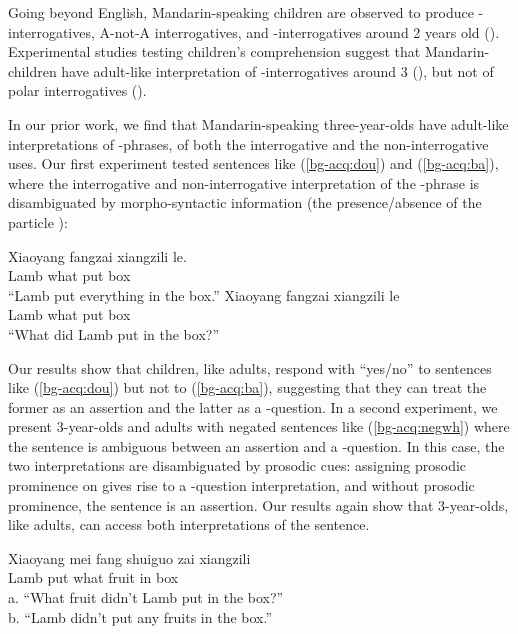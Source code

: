 Going beyond English, Mandarin-speaking children are observed to produce \ma-interrogatives, A-not-A interrogatives, and \twh-interrogatives around 2 years old (\citealt{miao1986acq, miao1992, lee1989acq, litang1991int, lichen1997compprod, lichen1997comp, fan2012, lijingwong2017}). Experimental studies testing children’s comprehension suggest that Mandarin-children have adult-like interpretation of \twh-interrogatives around 3 (\citealt{fahn2003acq}), but not of polar interrogatives (\citealt{moradlou2020}). 

In our prior work, we find that Mandarin-speaking three-year-olds have adult-like interpretations of \twh-phrases, of both the interrogative and the non-interrogative uses. Our first experiment tested sentences like (\ref{bg-acq:dou}) and (\ref{bg-acq:ba}), where the interrogative and non-interrogative interpretation of the \twh-phrase is disambiguated by morpho-syntactic information (the presence/absence of the particle \dou{}):

	
\gll Xiaoyang 	 	 	fangzai 	xiangzili 	le.\\
Lamb	what	\Dou{}	put 	box		\Asp{}\\
``Lamb put everything in the box.''
\eex
{}
\gll Xiaoyang	  	fangzai 	xiangzili 	le\\
	Lamb		what	put	box		\Asp{}\\
	``What did Lamb put in the box?''
\eex


Our results show that children, like adults, respond with “yes/no” to sentences like (\ref{bg-acq:dou}) but not to (\ref{bg-acq:ba}), suggesting that they can treat the former as an assertion and the latter as a \twh-question. In a second experiment, we present 3-year-olds and adults with negated sentences like (\ref{bg-acq:negwh}) where the sentence is ambiguous between an assertion and a \twh-question. In this case, the two interpretations are disambiguated by prosodic cues: assigning prosodic prominence on  gives rise to a \twh-question interpretation, and without prosodic prominence, the sentence is an assertion. Our results again show that 3-year-olds, like adults, can access both interpretations of the sentence.


\gll Xiaoyang mei	fang	 shuiguo zai	xiangzili\\
Lamb \Neg{}	put	what		fruit		in	box\\
\trans a. ``What fruit didn't Lamb put in the box?''\\
b.	``Lamb didn't put any fruits in the box.''
\eex

